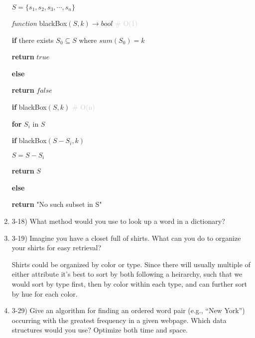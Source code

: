 \documentclass{article}
\begin{document}
\begin{enumerate}
{\begin{minipage}{0.8\textwidth}
    \(S = \{s_1, s_2, s_3, \cdots, s_n\}\)

    \textit{function} blackBox$(S, k) \rightarrow bool$ \textcolor{lightgray}{ \# O(1)}

    \quad \textbf{if} there exists $S_0 \subseteq S$ where $sum(S_0) = k$
        
    \quad \quad \textbf{return} $true$
    
    \quad \textbf{else}
        
    \quad \quad \textbf{return} $false$

    \textbf{if} blackBox$(S, k)$ \textcolor{lightgray}{ \# O(n)}
    
    \quad \textbf{for} $S_i$ in $S$

    \quad \quad \textbf{if} blackBox$(S - S_i, k)$

    \quad \quad \quad $S = S - S_i$

    \quad \textbf{return} $S$

    \textbf{else}

    \quad \textbf{return} "No such subset in S"

    \end{minipage}
    }

    
    
    \item 3-18) What method would you use to look up a word in a dictionary?
    
    
    
    \item 3-19) Imagine you have a closet full of shirts. What can you do to organize your shirts for easy retrieval?
    
    Shirts could be organized by color or type. Since there will usually multiple of either attribute it's best to sort by both following a heirarchy, such that we would sort by type first, then by color within each type, and can further sort by hue for each color.
    
    \item 3-29) Give an algorithm for finding an ordered word pair (e.g., “New York”) occurring with the greatest frequency in a given webpage. Which data structures would you use? Optimize both time and space. 



\end{enumerate}
\end{document}
